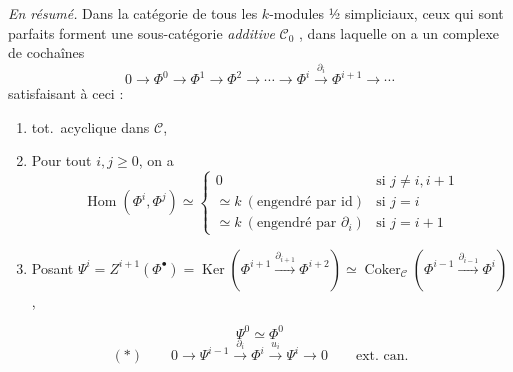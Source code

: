 \documentclass[11pt,a4paper]{article}
\begin{document}
\emph{En résumé.} Dans la catégorie   de tous les $k$-modules ½
simpliciaux, ceux qui sont parfaits forment une sous-catégorie \emph{additive}
$\mathcal{C}_0$ \struck{\ill{}}, dans laquelle on a un complexe de cochaînes
\[
0 \to \Phi^{0} \to \Phi^{1} \to \Phi^{2} \to \cdots \to \Phi^{i} \xrightarrow{\ \partial_i\ } \Phi^{i+1} \to \cdots
\]
satisfaisant à ceci :
\begin{enumerate}
\item[(a)]  tot.\ acyclique dans $\mathcal{C}$, \struck{\ill{}}
\item[(b)] Pour tout $i, j \geq 0$, on a
\[
\operatorname{Hom}(\Phi^{i}, \Phi^{j}) \simeq
\begin{cases}
0 & \text{si } j \neq i, i+1 \\
\simeq k \ (\text{engendré par } \mathrm{id}) & \text{si } j = i \\
\simeq k \ (\text{engendré par } \partial_i) & \text{si } j = i+1
\end{cases}
\]
\item[(c)] Posant $\Psi^{i} = Z^{i+1}(\Phi^{\bullet}) = \operatorname{Ker}(\Phi^{i+1} \xrightarrow{\partial_{i+1}}
\Phi^{i+2}) \simeq \operatorname{Coker}_{\mathcal{C}}(\Phi^{i-1} \xrightarrow{\partial_{i-1}} \Phi^{i})$,
\end{enumerate}
\[
\Psi^{0} \simeq \Phi^{0}
\]
\[
(*) \qquad 0 \to \Psi^{i-1} \xrightarrow{\ \partial_i\ } \Phi^{i} \xrightarrow{\ u_i\ } \Psi^{i} \to 0
\qquad \text{ext.\ can.}
\]
\end{document}
